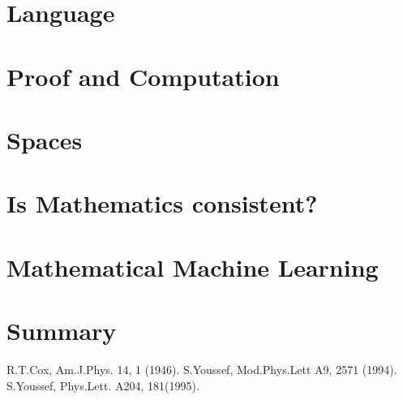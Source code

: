 \documentclass[11pt]{article}
\begin{document}
\section{Language}

\section{Proof and Computation}
\section{Spaces}
\section{Is Mathematics consistent?}
\section{Mathematical Machine Learning}
\section{Summary}


\begin{thebibliography}{10}
 R.T.Cox, Am.J.Phys. 14, 1 (1946).
 S.Youssef, Mod.Phys.Lett A9, 2571 (1994).
 S.Youssef, Phys.Lett. A204, 181(1995).

\end{thebibliography}
\end{document}
